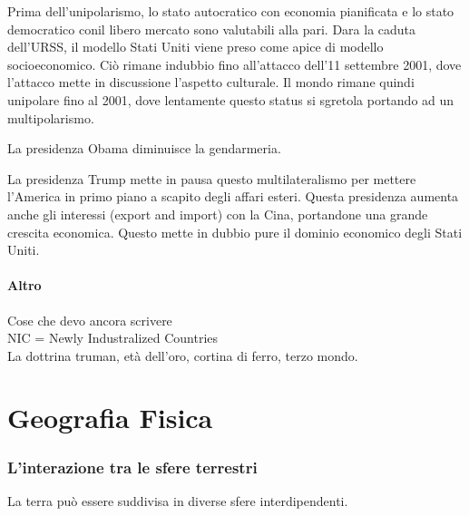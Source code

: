 \documentclass[a4paper]{article}
\begin{document}
Prima dell'unipolarismo, lo stato autocratico con economia pianificata e
lo stato democratico conil libero mercato sono valutabili alla pari.
Dara la caduta dell'URSS, il modello Stati Uniti viene preso come apice
di modello socioeconomico.
Ciò rimane indubbio fino all'attacco dell'11 settembre 2001, dove l'attacco mette
in discussione l'aspetto culturale.
Il mondo rimane quindi unipolare fino al 2001, dove lentamente questo status si sgretola
portando ad un multipolarismo.

La presidenza Obama diminuisce la gendarmeria.

La presidenza Trump mette in pausa questo multilateralismo per mettere l'America
in primo piano a scapito degli affari esteri.
Questa presidenza aumenta anche gli interessi (export and import) con la Cina, portandone
una grande crescita economica. Questo mette in dubbio pure
il dominio economico degli Stati Uniti.


\subsection{Altro}

Cose che devo ancora scrivere \\

NIC = Newly Industralized Countries \\%

La dottrina truman, età dell'oro, cortina di ferro, terzo mondo.



\pagebreak

\part{Geografia Fisica}

\section{L'interazione tra le sfere terrestri}

La terra può essere suddivisa in diverse sfere interdipendenti.


    
\end{document}
